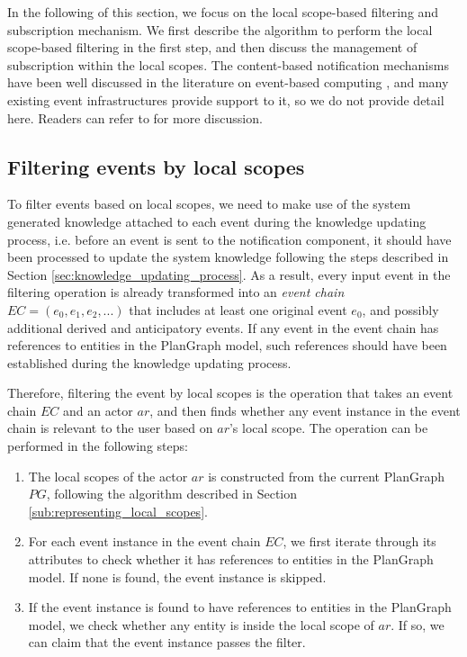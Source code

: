 In the following of this section, we focus on the local scope-based filtering and subscription mechanism. We first describe the algorithm to perform the local scope-based filtering in the first step, and then discuss the management of subscription within the local scopes. The content-based notification mechanisms have been well discussed in the literature on event-based computing \cite{eugster2003many}, and many existing event infrastructures provide support to it, so we do not provide detail here. Readers can refer to \cite{Mhl2010} for more discussion.

\subsection{Filtering events by local scopes} %
\label{sub:event_filtering_algorithm}
To filter events based on local scopes, we need to make use of the system generated knowledge attached to each event during the knowledge updating process, i.e. before an event is sent to the notification component, it should have been processed to update the system knowledge following the steps described in Section \ref{sec:knowledge_updating_process}. As a result, every input event in the filtering operation is already transformed into an \emph{event chain} $EC=(e_0, e_1, e_2, ...)$ that includes at least one original event $e_0$, and possibly additional derived and anticipatory events. If any event in the event chain has references to entities in the PlanGraph model, such references should have been established during the knowledge updating process.

Therefore, filtering the event by local scopes is the operation that takes an event chain $EC$ and an actor $ar$, and then finds whether any event instance in the event chain is relevant to the user based on $ar$'s local scope. The operation can be performed in the following steps:

\begin{enumerate}
	\item The local scopes of the actor $ar$ is constructed from the current PlanGraph $PG$, following the algorithm described in Section \ref{sub:representing_local_scopes}.
	\item For each event instance in the event chain $EC$, we first iterate through its attributes to check whether it has references to entities in the PlanGraph model. If none is found, the event instance is skipped.
	\item If the event instance is found to have references to entities in the PlanGraph model, we check whether any entity is inside the local scope of $ar$. If so, we can claim that the event instance passes the filter.
\end{enumerate}

